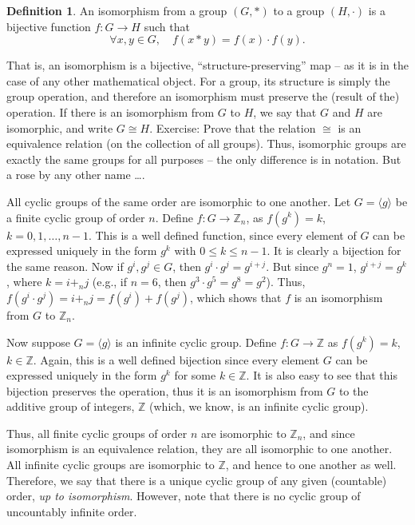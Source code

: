 \documentclass[svgnames]{article}
\theoremstyle{definition}
\newtheorem{Definition}[Theorem]{Definition}
\theoremstyle{remark}
\begin{document}
\begin{appendices}
\begin{Definition}\label{def:Isomorphism}
An isomorphism from a group $(G, *)$ to a group $(H, \cdot)$ is a bijective function $f \colon G \to H$ such that
\begin{equation*}
\forall x, y \in G, \quad f(x * y) = f(x) \cdot f(y).
\end{equation*}
\end{Definition}
That is, an isomorphism is a bijective, ``structure-preserving'' map -- as it is in the case of any other mathematical object. For a group, its structure is simply the group operation, and therefore an isomorphism must preserve the (result of the) operation. If there is an isomorphism from $G$ to $H$, we say that $G$ and $H$ are isomorphic, and write $G \cong H$. {\small Exercise: Prove that the relation $\cong$ is an equivalence relation (on the collection of all groups)}. Thus, isomorphic groups are exactly the same groups for all purposes -- the only difference is in notation. But a rose by any other name \ldots.

All cyclic groups of the same order are isomorphic to one another. Let $G = \langle g \rangle$ be a finite cyclic group of order $n$. Define $f \colon G \to \mathbb Z_n$, as $f(g^k) = k$, $k = 0, 1, \ldots, n - 1$. This is a well defined function, since every element of $G$ can be expressed uniquely in the form $g^k$ with $0 \le k \le n - 1$. It is clearly a bijection for the same reason. Now if $g^i, g^j \in G$, then $g^i \cdot g^j = g^{i + j}$. But since $g^n = 1$, $g^{i + j} = g^k$, where $k = i +_n j$ (e.g., if $n = 6$, then $g^3 \cdot g^5 = g^8 = g^2$). Thus, $f(g^i \cdot g^j) = i +_n j = f(g^i) + f(g^j)$, which shows that $f$ is an isomorphism from $G$ to $\mathbb Z_n$.

Now suppose $G = \langle g \rangle$ is an infinite cyclic group. Define $f\colon G \to \mathbb Z$ as $f(g^k) = k$, $k \in \mathbb Z$. Again, this is a well defined bijection since every element $G$ can be expressed uniquely in the form $g^k$ for some $k \in \mathbb Z$. It is also easy to see that this bijection preserves the operation, thus it is an isomorphism from $G$ to the additive group of integers, $\mathbb Z$ (which, we know, is an infinite cyclic group).

Thus, all finite cyclic groups of order $n$ are isomorphic to $\mathbb Z_n$, and since isomorphism is an equivalence relation, they are all isomorphic to one another. All infinite cyclic groups are isomorphic to $\mathbb Z$, and hence to one another as well. Therefore, we say that there is a unique cyclic group of any given (countable) order, \emph{up to isomorphism}. However, note that there is no cyclic group of uncountably infinite order.


\end{appendices}
\end{document}
